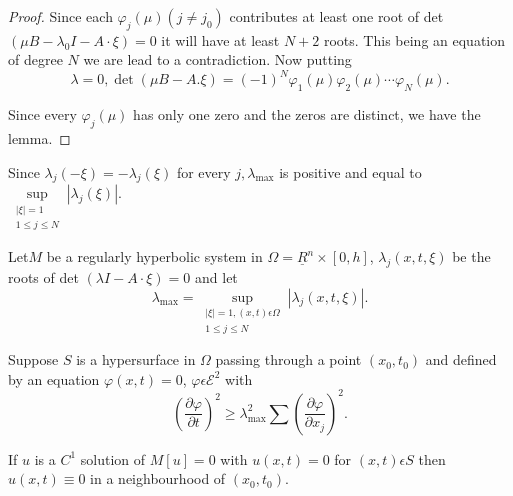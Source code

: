 \begin{proof}
Since each $\varphi_j (\mu)(j \neq j_0)$ contributes at least one root
of det $(\mu B -\lambda_0 I-A \cdot \xi) = 0$ it will have at least $N + 2$
roots. This being an equation of degree $N$ we are lead to a
contradiction. Now putting   
$$
\lambda=0, \det (\mu B-A. \xi)= (-1)^N \varphi_1 (\mu) \varphi_2 
(\mu) \cdots \varphi_N (\mu). 
$$

Since every $\varphi_j (\mu)$ has only one zero and the zeros are
distinct, we have the lemma. 
\end{proof}

\begin{remark*}%
Since $\lambda_j (-\xi ) = - \lambda_j (\xi )$ for every $j,
\lambda_{\max}$ is positive and equal to  $\sup\limits_{\substack {|
    \xi |=1\\ 1 \leq j \leq N}} | \lambda_j (\xi)|$. 
\end{remark*}

\setcounter{corollary}{0}
\begin{corollary}\label{chap3-sec7-coro1}%
Let\pageoriginale $M$ be a regularly hyperbolic system in $\Omega =
\underline{R}^n  
\times [0, h]$, $\lambda_j (x, t, \xi)$ be the roots of det $(\lambda
I - A \cdot \xi) = 0$ and let 
\begin{equation}
\lambda_{\max} =\sup_{\substack{| \xi | =1, (x, t) \epsilon \Omega
    \\ 1\leq j \leq N}} | \lambda_j (x, t, \xi
)|. \tag{7.7}\label{chap3-eq7.7}  
\end{equation}

Suppose $S$ is a hypersurface in $\Omega$ passing through a point
$(x_0, t_0)$ and defined by an equation $\varphi (x, t) = 0$, $\varphi
\epsilon \mathscr{E}^2$ with 
\begin{equation}
\left(\frac{\partial \varphi}{ \partial t}\right)^2 \geq  \lambda^2_{\max}\sum
  \left(\frac{\partial \varphi}{\partial
    x_j}\right)^2. \tag{7.8} \label{chap3-eq7.8} 
 \end{equation} 

If $u$ is a $C^1$ solution of $M [u] = 0$ with $u(x, t) = 0$ for $(x, 
 t) \epsilon S$ then $u (x, t)\equiv 0$ in a neighbourhood of $(x_0,
 t_0)$. 
\end{corollary}

